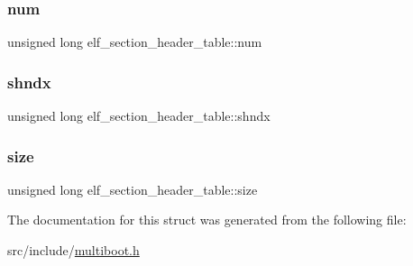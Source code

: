 \subsubsection{\texorpdfstring{num}{num}}
{\footnotesize\ttfamily unsigned long elf\+\_\+section\+\_\+header\+\_\+table\+::num}

\mbox{\label{structelf__section__header__table_a449a7a6aaebf6946c4580649451cf463}} 
\subsubsection{\texorpdfstring{shndx}{shndx}}
{\footnotesize\ttfamily unsigned long elf\+\_\+section\+\_\+header\+\_\+table\+::shndx}

\mbox{\label{structelf__section__header__table_a2b95483fa97636019b8080792c6968b7}} 
\subsubsection{\texorpdfstring{size}{size}}
{\footnotesize\ttfamily unsigned long elf\+\_\+section\+\_\+header\+\_\+table\+::size}



The documentation for this struct was generated from the following file\+:\begin{DoxyCompactItemize}
\item 
src/include/\hyperlink{multiboot_8h}{multiboot.\+h}\end{DoxyCompactItemize}
